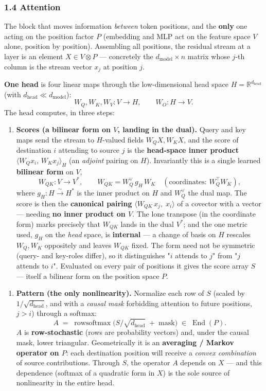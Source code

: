 \subsubsection*{1.4 Attention}
The block that moves information \emph{between} token positions, and the \textbf{only} one acting on the position factor $P$ (embedding and MLP act on the feature space $V$ alone, position by position). Assembling all positions, the residual stream at a layer is an element $X \in V \otimes P$ --- concretely the $d_{\text{model}}\times n$ matrix whose $j$-th column is the stream vector $x_j$ at position $j$.


\textbf{One head} is four linear maps through the low-dimensional head space $H = \mathbb{R}^{d_{\text{head}}}$ (with $d_{\text{head}} \ll d_{\text{model}}$): \[ W_Q, W_K, W_V : V \to H, \qquad W_O : H \to V. \] The head computes, in three steps:


\begin{enumerate}
\item \textbf{Scores (a bilinear form on $V$, landing in the dual).} Query and key maps send the stream to $H$-valued fields $W_Q X, W_K X$, and the score of destination $i$ attending to source $j$ is the \textbf{head-space inner product} $\langle W_Q x_i,\, W_K x_j\rangle_H$ (an \emph{adjoint} pairing on $H$). Invariantly this is a single learned \textbf{bilinear form} on $V$, \[ W_{QK} : V \to V^{*}, \qquad W_{QK} = W_Q^{\vee}\, g_H\, W_K \quad(\text{coordinates: } W_Q^{\top}W_K), \] where $g_H:H\xrightarrow{\sim}H^{*}$ is the inner product on $H$ and $W_Q^{\vee}$ the dual map. The score is then the \textbf{canonical pairing} $\langle W_{QK}\,x_j,\; x_i\rangle$ of a covector with a vector --- needing \textbf{no inner product on $V$}. The lone transpose (in the coordinate form) marks precisely that $W_{QK}$ lands in the dual $V^{*}$; and the one metric used, $g_H$ on the \emph{head} space, is \textbf{internal} --- a change of basis on $H$ rescales $W_Q, W_K$ oppositely and leaves $W_{QK}$ fixed. The form need not be symmetric (query- and key-roles differ), so it distinguishes "$i$ attends to $j$" from "$j$ attends to $i$". Evaluated on every pair of positions it gives the score array $S$ --- itself a bilinear form on the position space $P$.
\end{enumerate}

\begin{enumerate}
\item \textbf{Pattern (the only nonlinearity).} Normalize each row of $S$ (scaled by $1/\sqrt{d_{\text{head}}}$, and with a \emph{causal mask} forbidding attention to future positions, $j>i$) through a softmax: \[ A \;=\; \operatorname{rowsoftmax}\!\big(S/\sqrt{d_{\text{head}}}\;+\;\text{mask}\big) \;\in\; \operatorname{End}(P). \] $A$ is \textbf{row-stochastic} (rows are probability vectors) and, under the causal mask, lower triangular. Geometrically it is an \textbf{averaging / Markov operator on $P$}: each destination position will receive a \emph{convex combination} of source contributions. Through $S$, the operator $A$ depends on $X$ --- and this dependence (softmax of a quadratic form in $X$) is the sole source of nonlinearity in the entire head.
\end{enumerate}

